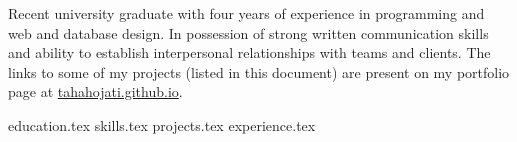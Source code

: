\documentclass[11pt, a4paper]{awesome-cv}
\newcommand*{\sectiondir}{resume/}
\begin{document}
\makecvheader


Recent university graduate with four years of experience in programming and web and database design. In possession of strong written communication skills and ability to establish interpersonal relationships with teams and clients. The links to some of my projects (listed in this document) are present on my portfolio page at \href{http://tahahojati.github.io}{tahahojati.github.io}.  %


{education.tex}
{skills.tex}
{projects.tex}
{experience.tex}
\end{document}
